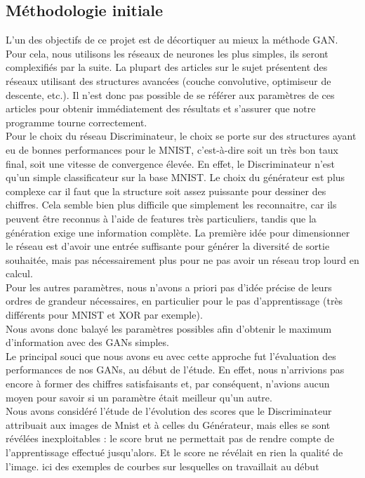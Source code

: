 	\subsection{Méthodologie initiale}
		L'un des objectifs de ce projet est de décortiquer au mieux la méthode GAN. Pour cela, nous utilisons les réseaux de neurones les plus simples, ils seront complexifiés par la suite. La plupart des articles sur le sujet présentent des réseaux utilisant des structures avancées (couche convolutive, optimiseur de descente, etc.). Il n'est donc pas possible de se référer aux paramètres de ces articles pour obtenir immédiatement des résultats et s'assurer que notre programme tourne correctement. \\
		Pour le choix du réseau Discriminateur, le choix se porte sur des structures ayant eu de bonnes performances pour le MNIST, c'est-à-dire soit un très bon taux final, soit une vitesse de convergence élevée. En effet, le Discriminateur n'est qu'un simple classificateur sur la base MNIST. Le choix du générateur est plus complexe car il faut que la structure soit assez puissante pour dessiner des chiffres. Cela semble bien plus difficile que simplement les reconnaitre, car ils peuvent être reconnus à l'aide de features très particuliers, tandis que la génération exige une information complète. La première idée pour dimensionner le réseau est d'avoir une entrée suffisante pour générer la diversité de sortie souhaitée, mais pas nécessairement plus pour ne pas avoir un réseau trop lourd en calcul.\\
		Pour les autres paramètres, nous n'avons a priori pas d'idée précise de leurs ordres de grandeur nécessaires, en particulier pour le pas d'apprentissage (très différents pour MNIST et XOR par exemple).\\
		Nous avons donc balayé les paramètres possibles afin d'obtenir le maximum d'information avec des GANs simples.\\
		Le principal souci que nous avons eu avec cette approche fut l'évaluation des performances de nos GANs, au début de l'étude. En effet, nous n'arrivions pas encore à former des chiffres satisfaisants et, par conséquent, n'avions aucun moyen pour savoir si un paramètre était meilleur qu'un autre. \\
		Nous avons considéré l'étude de l'évolution des scores que le Discriminateur attribuait aux images de Mnist et à celles du Générateur, mais elles se sont révélées inexploitables : le score brut ne permettait pas de rendre compte de l'apprentissage effectué jusqu'alors. Et le score ne révélait en rien la qualité de l'image. 
{ici des exemples de courbes sur lesquelles on travaillait au début } 




